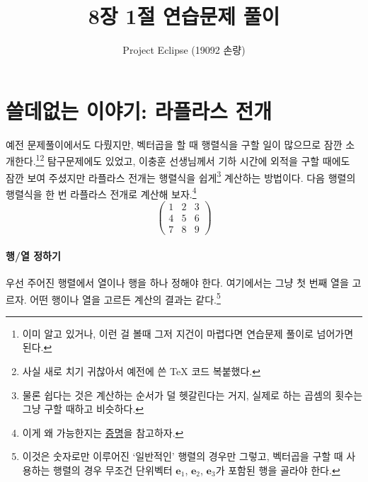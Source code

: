 \documentclass{scrartcl}
\title{8장 1절 연습문제 풀이}
\author{Project Eclipse (19092 손량)}
\date{}
\begin{document}
\maketitle

\section{쓸데없는 이야기: 라플라스 전개}
예전 문제풀이에서도 다뤘지만, 벡터곱을 할 때 행렬식을 구할 일이 많으므로 잠깐 소개한다.\footnote{이미 알고 있거나, 이런 걸 볼때 그저 지건이 마렵다면 연습문제 풀이로 넘어가면 된다.}\footnote{사실 새로 치기 귀찮아서 예전에 쓴 TeX 코드 복붙했다.} 탐구문제에도 있었고, 이충훈 선생님께서 기하 시간에 외적을 구할 때에도 잠깐 보여 주셨지만 라플라스 전개는 행렬식을 쉽게\footnote{물론 쉽다는 것은 계산하는 순서가 덜 헷갈린다는 거지, 실제로 하는 곱셈의 횟수는 그냥 구할 때하고 비슷하다.} 계산하는 방법이다. 다음 행렬의 행렬식을 한 번 라플라스 전개로 계산해 보자.\footnote{이게 왜 가능한지는 \href{https://en.wikipedia.org/wiki/Laplace_expansion\#Proof}{증명}을 참고하자.}
\[
\begin{pmatrix}
1 & 2 & 3\\
4 & 5 & 6\\
7 & 8 & 9
\end{pmatrix}
\]
\paragraph{행/열 정하기} 우선 주어진 행렬에서 열이나 행을 하나 정해야 한다. 여기에서는 그냥 첫 번째 열을 고르자. 어떤 행이나 열을 고르든 계산의 결과는 같다.\footnote{이것은 숫자로만 이루어진 `일반적인' 행렬의 경우만 그렇고, 벡터곱을 구할 때 사용하는 행렬의 경우 무조건 단위벡터 \(\mathbf{e}_1\), \(\mathbf{e}_2\), \(\mathbf{e}_3\)가 포함된 행을 골라야 한다.}
\end{document}

